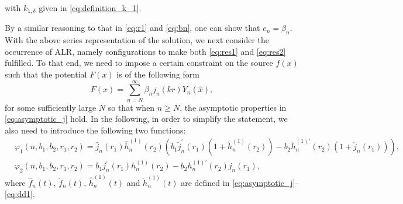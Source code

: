 \documentclass[11pt,reqno,twoside]{amsart}
\theoremstyle{definition}
\theoremstyle{remark}
\numberwithin{equation}{section}
\begin{document}
with $k_{1,\delta}$ given in \eqref{eq:definition_k_1}.

By a similar reasoning to that in \eqref{eq:r1} and \eqref{eq:bn}, one can show that $e_n=\beta_n$. With the above series representation of the solution, we next consider the occurrence of ALR, namely configurations to make both \eqref{eq:res1} and \eqref{eq:res2} fulfilled. To that end, we need to impose a certain constraint on the source $f(x)$ such that the potential $F(x)$ is of the following form
\begin{equation}\label{eq:potential_F_constain}
 F(x)=\sum_{n=N}^{\infty} \beta_n j_n(kr)Y_n(\hat{x}),
\end{equation}
for some sufficiently large $N$ so that when $n\geq N$,  the asymptotic properties in \eqref{eq:asymptotic_j} hold. In the following, in order to simplify the statement, we also need to introduce the following two functions:
\begin{equation*}
\begin{split}
& \varphi_1(n,b_1,b_2,r_1,r_2)=\hat{j}_n(r_1) \hat{h}_n^{(1)}(r_2)  \left( b_1 \check{j}_n^{\prime}(r_1)\left(1+\check{h}_n^{(1)}(r_2)\right)   -b_2\check{h}_n^{(1)\prime}(r_2)\left(1+\check{j}_n(r_1)\right) \right),\\
& \varphi_2(n,b_1,b_2,r_1,r_2)= b_1 j_n^{\prime}(r_1) h_n^{(1)}(r_2) - b_2 h_n^{(1)\prime}(r_2) j_n(r_1) , 
\end{split}
\end{equation*}
where  $\hat{f}_n(t)$, $\check{f}_n(t)$, $\hat{h}_n^{(1)}(t)$ and $\check{h}_n^{(1)}(t)$ are defined in \eqref{eq:asymptotic_j}--\eqref{eq:dd1}. 
\end{document}

